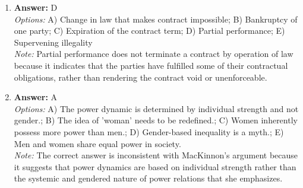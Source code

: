 \documentclass[12pt]{article}
\begin{document}
\begin{enumerate}[label=\arabic*.]
\item \textbf{Answer:} D
\\ \textit{Options:} A) Change in law that makes contract impossible; B) Bankruptcy of one party; C) Expiration of the contract term; D) Partial performance; E) Supervening illegality
\\ \textit{Note:} Partial performance does not terminate a contract by operation of law because it indicates that the parties have fulfilled some of their contractual obligations, rather than rendering the contract void or unenforceable.
\item \textbf{Answer:} A
\\ \textit{Options:} A) The power dynamic is determined by individual strength and not gender.; B) The idea of 'woman' needs to be redefined.; C) Women inherently possess more power than men.; D) Gender-based inequality is a myth.; E) Men and women share equal power in society.
\\ \textit{Note:} The correct answer is inconsistent with MacKinnon's argument because it suggests that power dynamics are based on individual strength rather than the systemic and gendered nature of power relations that she emphasizes.
\end{enumerate}
\end{document}
